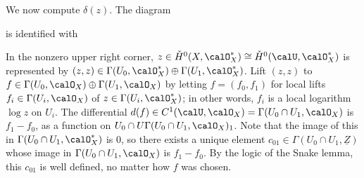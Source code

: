 \begin{example}
    We now compute $\delta(z)$. The diagram
    \begin{center}
    \end{center}
    is identified with 
    \begin{center}
    \end{center}
    In the nonzero upper right corner, $z \in \check{H}^0(X, \calO_X^*) \cong \check{H}^0(\calU, \calO_X^*)$ is represented by $(z,z) \in \Gamma(U_0, \calO_X^*) \oplus \Gamma(U_1, \calO_X^*)$. Lift $(z,z)$ to $f \in \Gamma(U_0, \calO_X) \oplus \Gamma(U_1, \calO_X)$ by letting $f = (f_0,f_1)$ for local lifts $f_i \in \Gamma(U_i, \calO_X)$ of $z \in \Gamma(U_i, \calO_X^*)$; in other words, $f_i$ is a local logarithm $\log z$ on $U_i$. The differential $d(f) \in C^1(\calU, \calO_X) = \Gamma(U_0 \cap U_1, \calO_X)$ is $f_1 - f_0$, as a function on $U_0 \cap U\Gamma(U_0 \cap U_1, \calO_X)_1$. Note that the image of this in $\Gamma(U_0 \cap U_1, \calO_X^*)$ is $0$, so there exists a unique element $c_{01} \in \Gamma(U_0 \cap U_1, \underline{Z})$ whose image in $\Gamma(U_0 \cap U_1, \calO_X)$ is $f_1 - f_0$. By the logic of the Snake lemma, this $c_{01}$ is well defined, no matter how $f$ was chosen.


\end{example}
